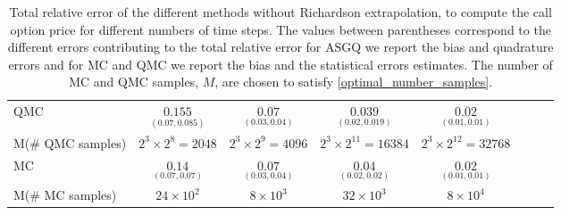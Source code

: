 \begin{table}[h!]
\begin{small}
\begin{tabular}{l*{6}{c}r}
			\hline
			QMC     & $\underset{(0.07,0.085)}{\mathbf{0.155}}$  & $\underset{(0.03,0.04)}{\mathbf{0.07}}$  & $\underset{(0.02,0.019)}{\mathbf{0.039}}$ & $\underset{(0.01,0.01)}{\mathbf{0.02}}$  \\		
			M(\# QMC samples)   & $2^3 \times 2^8=2048$  &  $2^3 \times 2^9=4096$  &  $2^3 \times 2^{11}=16384$ &  $2^3 \times 2^{12}=32768$ \\
%			
			\hline
			MC    & $\underset{(0.07,0.07)}{\mathbf{0.14}}$  & $\underset{(0.03,0.04)}{\mathbf{0.07}}$  & $\underset{(0.02,0.02)}{\mathbf{0.04}}$ & $\underset{(0.01,0.01)}{\mathbf{0.02}}$  \\		
			M(\# MC samples)   & $24 \times 10^2$  & $8 \times 10^3$  & $32 \times 10^3$ & $8 \times 10^4$  \\		
			\bottomrule[1.25pt]
		\end{tabular}
		\caption{Total relative error of the different methods without Richardson extrapolation, to compute the call option price  for different numbers of time steps. The values between parentheses correspond to the different errors contributing to the total relative error\red{;} for ASGQ we report the bias and quadrature errors and for MC and QMC we report the bias and the statistical errors estimates. The number of MC and QMC samples, $M$, are chosen to satisfy \eqref{optimal_number_samples}.}
		\label{Total error of MISC and MC to compute Call option price of the different tolerances for different number of time steps. Case set 5, without Richardson extrapolation. The numbers between parentheses are the corresponding absolute errors.}
	\end{small}
\end{table}

